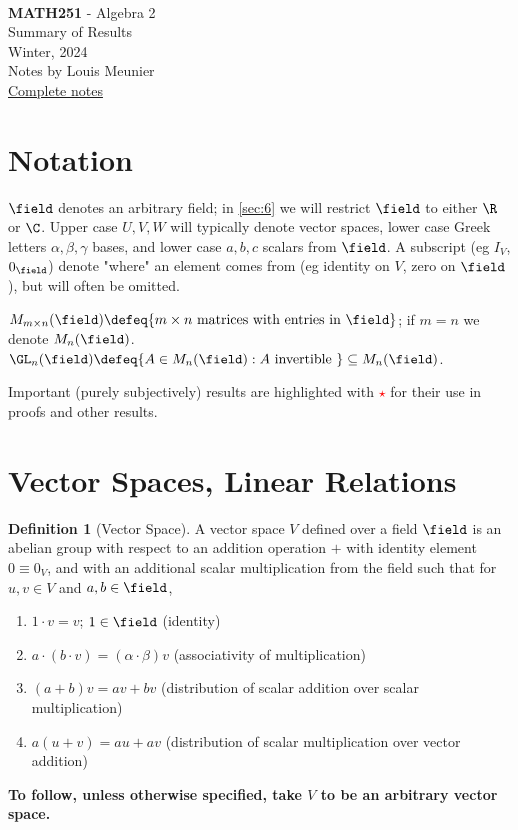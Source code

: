 \documentclass[12pt, oneside]{article}
\newcommand{\pageauthor}{Louis Meunier}
\newcommand{\pagetitle}{Algebra 2}
\newcommand{\pagesubtitle}{MATH251}
\newcommand{\pagedescription}{Summary of Results}
\newcommand{\pagesemester}{Winter, 2024 }
\newcommand{\thetitle}{
  \noindent
  \vspace*{5em}\\
  {\Large\textbf{\pagesubtitle} - \pagetitle}\\
  {\small{\pagedescription}}
  \vspace*{2em}\\
  {\small \pagesemester\\
  Notes by \pageauthor}\\
  {\small \href{https://notes.louismeunier.net/Algebra 2/algebra2.pdf}{Complete notes}}
}
\theoremstyle{definition}
\newtheorem{defn}{Definition}
\theoremstyle{plain}
\theoremstyle{remark}
\let\origsection=\section
\renewcommand\section[1]{\origsection{#1}\label{sec:\thesection}}
\begin{document}
\thetitle
\tableofcontents
{}

\section{Notation}

$\field$ denotes an arbitrary field; in \cref{sec:6} we will restrict $\field$ to either $\R$ or $\C$. Upper case $U, V, W$ will typically denote vector spaces, lower case Greek letters $\alpha, \beta, \gamma$ bases, and lower case $a, b, c$ scalars from $\field$. A subscript (eg $I_V$, $0_\field$) denote "where" an element comes from (eg identity on $V$, zero on $\field$), but will often be omitted.

$M_{m \times n}(\field) \defeq \{m \times n \text{ matrices with entries in }\field \}$; if $m = n$ we denote $M_n(\field)$. $\GL_n(\field) \defeq \{A \in M_n(\field) : A \text{ invertible }\} \subseteq M_n(\field)$.

Important (purely subjectively) results are highlighted with \textcolor{red}{$\star$} for their use in proofs and other results.

\section{Vector Spaces, Linear Relations}


\begin{defn}[Vector Space]
  A vector space $V$ defined over a field $\field$ is an abelian group with respect to an addition operation $+$ with identity element $0 \equiv 0_V$, and with an additional scalar multiplication from the field such that for $u, v \in V$ and $a, b\in \field$, \begin{enumerate}
    \item $1 \cdot v = v$; $1 \in \field$ (identity)
    \item $a \cdot (b \cdot v) = (\alpha \cdot \beta)v$ (associativity of multiplication)
    \item $(a+b)v = a v + b v$ (distribution of scalar addition over scalar multiplication)
    \item $a (u + v) = a u + av$ (distribution of scalar multiplication over vector addition)
  \end{enumerate}
\end{defn}

\textbf{To follow, unless otherwise specified, take $V$ to be an arbitrary vector space.}
\end{document}
